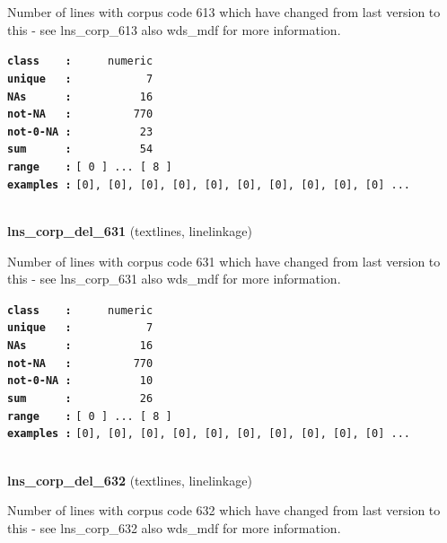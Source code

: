 \documentclass[]{article}
\begin{document}
Number of lines with corpus code 613 which have changed from last
version to this - see lns\_corp\_613 also wds\_mdf for more information.

\textbf{\texttt{class\ \ \ \ :}} \texttt{~~~~~numeric}\\
\textbf{\texttt{unique\ \ \ :}} \texttt{~~~~~~~~~~~7}\\
\textbf{\texttt{NAs\ \ \ \ \ \ :}} \texttt{~~~~~~~~~~16}\\
\textbf{\texttt{not-NA\ \ \ :}} \texttt{~~~~~~~~~770}\\
\textbf{\texttt{not-0-NA\ :}} \texttt{~~~~~~~~~~23}\\
\textbf{\texttt{sum\ \ \ \ \ \ :}} \texttt{~~~~~~~~~~54}\\
\textbf{\texttt{range\ \ \ \ :}}
\texttt{{[}\ 0\ {]}\ ...\ {[}\ 8\ {]}}\\
\textbf{\texttt{examples\ :}}
\texttt{{[}0{]},\ {[}0{]},\ {[}0{]},\ {[}0{]},\ {[}0{]},\ {[}0{]},\ {[}0{]},\ {[}0{]},\ {[}0{]},\ {[}0{]}\ ...}\\

~

\textbf{lns\_corp\_del\_631} (textlines, linelinkage)

Number of lines with corpus code 631 which have changed from last
version to this - see lns\_corp\_631 also wds\_mdf for more information.

\textbf{\texttt{class\ \ \ \ :}} \texttt{~~~~~numeric}\\
\textbf{\texttt{unique\ \ \ :}} \texttt{~~~~~~~~~~~7}\\
\textbf{\texttt{NAs\ \ \ \ \ \ :}} \texttt{~~~~~~~~~~16}\\
\textbf{\texttt{not-NA\ \ \ :}} \texttt{~~~~~~~~~770}\\
\textbf{\texttt{not-0-NA\ :}} \texttt{~~~~~~~~~~10}\\
\textbf{\texttt{sum\ \ \ \ \ \ :}} \texttt{~~~~~~~~~~26}\\
\textbf{\texttt{range\ \ \ \ :}}
\texttt{{[}\ 0\ {]}\ ...\ {[}\ 8\ {]}}\\
\textbf{\texttt{examples\ :}}
\texttt{{[}0{]},\ {[}0{]},\ {[}0{]},\ {[}0{]},\ {[}0{]},\ {[}0{]},\ {[}0{]},\ {[}0{]},\ {[}0{]},\ {[}0{]}\ ...}\\

~

\textbf{lns\_corp\_del\_632} (textlines, linelinkage)

Number of lines with corpus code 632 which have changed from last
version to this - see lns\_corp\_632 also wds\_mdf for more information.
\end{document}
